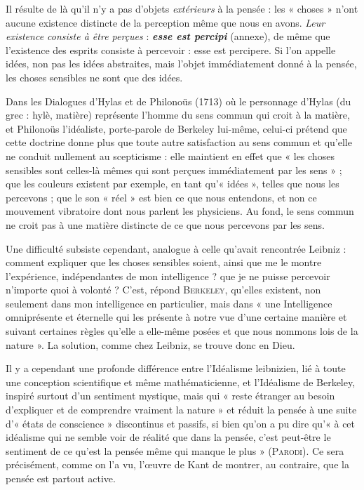 Il résulte de là qu’il n’y a pas d’objets {\it extérieurs} à la pensée : les
« choses » n’ont aucune existence distincte de la perception même que
nous en avons. {\it Leur existence consiste à être perçues} : \textbf{\textit {esse est percipi}}
(annexe), de même que l’existence des esprits consiste à percevoir : esse
est percipere. Si l’on appelle idées, non pas les idées abstraites, mais
l’objet immédiatement donné à la pensée, les choses sensibles ne sont
que des idées.

Dans les Dialogues d'Hylas et de Philonoüs (1713) où le personnage
d'Hylas (du grec : hylè, matière) représente l'homme du sens commun qui
croit à la matière, et Philonoüs l’idéaliste, porte-parole de Berkeley lui-même,
celui-ci prétend que cette doctrine donne plus que toute autre satisfaction
au sens commun et qu’elle ne conduit nullement au scepticisme : elle
maintient en effet que « les choses sensibles sont celles-là mêmes qui sont
perçues immédiatement par les sens » ; que les couleurs existent par exemple,
en tant qu’« idées », telles que nous les percevons ; que le son « réel » est
bien ce que nous entendons, et non ce mouvement vibratoire dont nous
parlent les physiciens. Au fond, le sens commun ne croit pas à une matière
distincte de ce que nous percevons par les sens.

Une difficulté subsiste cependant, analogue à celle qu’avait rencontrée
Leibniz : comment expliquer que les choses sensibles soient,
ainsi que me le montre l’expérience, indépendantes de mon intelligence ?
que je ne puisse percevoir n’importe quoi à volonté ? C'est,
répond \textsc{Berkeley}, qu’elles existent, non seulement dans mon
intelligence en particulier, mais dans « une Intelligence omniprésente
et éternelle qui les présente à notre vue d’une certaine manière et
suivant certaines règles qu’elle a elle-même posées et que nous
nommons lois de la nature ». La solution, comme chez Leibniz, se
trouve donc en Dieu.

Il y a cependant une profonde différence entre l’Idéalisme leibnizien,
lié à toute une conception scientifique et même mathématicienne,
et l'Idéalisme de Berkeley, inspiré surtout d’un sentiment mystique,
mais qui « reste étranger au besoin d'expliquer et de comprendre
vraiment la nature » et réduit la pensée à une suite d'« états de
conscience » discontinus et passifs, si bien qu’on a pu dire qu’« à cet
idéalisme qui ne semble voir de réalité que dans la pensée, c’est
peut-être le sentiment de ce qu’est la pensée même qui manque le
plus » (\textsc{Parodi}). Ce sera précisément, comme on l’a vu, l’œuvre de
Kant de montrer, au contraire, que la pensée est partout active.

